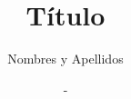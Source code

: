\documentclass[11pt,openany,final]{unsa}
\title{Título}
\author{Nombres y Apellidos}%
\date{-}
\begin{document}


\begin{frontmatter}
\dedicatory
\begin{singlespace}
\tableofcontents \listoffigures \listoftables \pagebreak
\end{singlespace}
%
\end{frontmatter}%

\pagestyle{fancyplain}





%



\begin{singlespace}
\end{singlespace}
\end{document}

